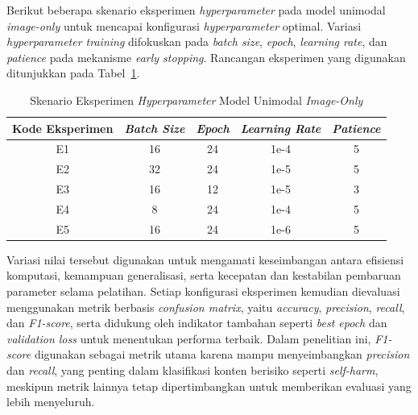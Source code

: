 Berikut beberapa skenario eksperimen \textit{hyperparameter} pada model unimodal \textit{ image-only} untuk mencapai konfigurasi \textit{hyperparameter} optimal. Variasi \textit{hyperparameter training} difokuskan pada \textit{batch size}, \textit{epoch}, \textit{learning rate}, dan \textit{patience} pada mekanisme \textit{early stopping}. Rancangan eksperimen yang digunakan ditunjukkan pada Tabel~\ref{tabel:skenario_hyperparameter_unimodal_image_only}.

\begin{table}[H]
    \centering
    \caption{Skenario Eksperimen \textit{Hyperparameter} Model Unimodal \textit{ Image-Only}}
    \label{tabel:skenario_hyperparameter_unimodal_image_only}
    \small
    \setlength{\tabcolsep}{8pt}
    \renewcommand{\arraystretch}{1.1}
    \begin{tabular}{c c c c c}
        \hline
        \textbf{Kode Eksperimen} & \textbf{\textit{Batch Size}} & \textbf{\textit{Epoch}} & \textbf{\textit{Learning Rate}} & \textbf{\textit{Patience}} \\
        \hline
        E1 & 16 & 24 & 1e-4 & 5 \\
        E2 & 32 & 24 & 1e-5 & 5 \\
        E3 & 16 & 12 & 1e-5 & 3 \\
        E4 & 8 & 24 & 1e-4 & 5 \\
        E5 & 16 & 24 & 1e-6 & 5 \\
        \hline
    \end{tabular}
\end{table}

 Variasi nilai tersebut digunakan untuk mengamati keseimbangan antara efisiensi komputasi, kemampuan generalisasi, serta kecepatan dan kestabilan pembaruan parameter selama pelatihan. Setiap konfigurasi eksperimen kemudian dievaluasi menggunakan metrik berbasis \textit{confusion matrix}, yaitu \textit{accuracy}, \textit{precision}, \textit{recall}, dan \textit{F1-score}, serta didukung oleh indikator tambahan seperti \textit{best epoch} dan \textit{validation loss} untuk menentukan performa terbaik. Dalam penelitian ini, \textit{F1-score} digunakan sebagai metrik utama karena mampu menyeimbangkan \textit{precision} dan \textit{recall}, yang penting dalam klasifikasi konten berisiko seperti \textit{self-harm}, meskipun metrik lainnya tetap dipertimbangkan untuk memberikan evaluasi yang lebih menyeluruh.



